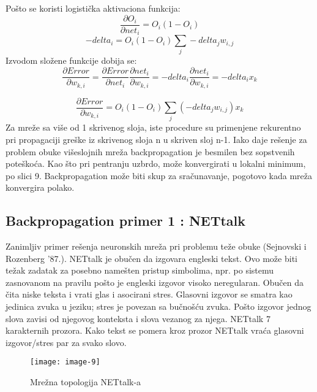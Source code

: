 \documentclass[fontsize=11bp, paper=a4]{scrarticle}
\begin{document}
Pošto se koristi logistička aktivaciona funkcija:
$$
\frac{\partial O_i}{\partial net_i} = O_i (1 - O_i)
$$
$$
-delta_i = O_i (1-O_i) \sum_j - delta_j w_{i,j}
$$
Izvodom složene funkcije dobija se:
$$
\frac{\partial Error}{\partial w_{k,i}} = \frac{\partial Error}{\partial net_i} \frac{\partial net_i}{\partial w_{k,i}} = -delta_i \frac{\partial net_i}{\partial w_{k,i}} = - delta_i x_k
$$

$$
\frac{\partial Error}{\partial w_{k,i}} = O_i (1- O_i)\sum_j (- delta_j w_{i,j}) x_k
$$
Za mreže sa više od 1 skrivenog sloja, iste procedure su primenjene rekurentno pri propagaciji greške iz skrivenog sloja n u skriven sloj n-1. Iako daje rešenje za problem obuke višeslojnih mreža backpropagation je besmilen bez sopstvenih poteškoća. Kao što pri pentranju uzbrdo, može konvergirati u lokalni minimum, po slici 9. Backpropagation može biti skup za sračunavanje, pogotovo kada mreža konvergira polako.

\subsection{Backpropagation primer 1 : NETtalk}
Zanimljiv primer rešenja neuronskih mreža pri problemu teže obuke (Sejnovski i Rozenberg '87.). NETtalk je obučen da izgovara engleski tekst. Ovo može biti težak zadatak za posebno namešten pristup simbolima, npr. po sistemu zasnovanom na pravilu pošto je engleski izgovor visoko neregularan. Obučen da čita niske teksta i vrati glas i asocirani stres. Glasovni izgovor se smatra kao jedinica zvuka u jeziku; stres je povezan sa bučnošću zvuka. Pošto izgovor jednog slova zavisi od njegovog konteksta i slova vezanog za njega. NETtalk 7 karakternih prozora. Kako tekst se pomera kroz prozor NETtalk vraća glasovni izgovor/stres par za svako slovo.

\begin{figure}[h!]
    \centering
    \texttt{[image: image-9]}
    \caption{Mrežna topologija NETtalk-a}
\end{figure}
\end{document}
